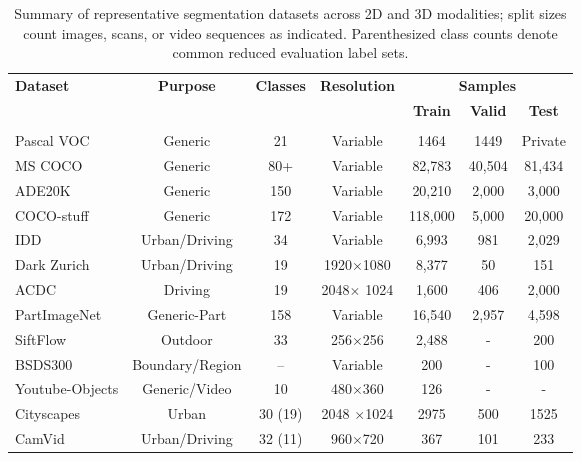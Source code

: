 \begin{table}[!t]
\centering
\caption{Summary of representative segmentation datasets across 2D and 3D modalities; split sizes count images, scans, or video sequences as indicated. Parenthesized class counts denote common reduced evaluation label sets.}
\label{tab:segmentation_dataset}
\fontsize{9}{11}\selectfont
\setlength{\tabcolsep}{3.7mm}
\begin{tabular}{l c cc ccc }
\toprule
\multirow{2}{*}{\textbf{Dataset}}   & \multirow{2}{*}{\textbf{Purpose}}   & \multirow{2}{*}{\textbf{Classes}} & \multirow{2}{*}{\textbf{Resolution}} & \multicolumn{3}{c}{\textbf{Samples}}  \\
\cmidrule(r){5-7}
  & & & & \textbf{Train} & \textbf{Valid} & \textbf{Test} \\
\midrule
\rowcolor{lightgrey}\multicolumn{7}{l}{$\bullet$ \textit{2D}}\\
Pascal VOC \cite{everingham2010pascal} & Generic & 21 & Variable & 1464 & 1449 & Private\\
MS COCO \cite{lin2014microsoft} & Generic & 80+ & Variable & 82,783 & 40,504 & 81,434\\
ADE20K \cite{zhou2017ade20k} & Generic & 150 & Variable & 20,210 & 2,000 & 3,000 \\
COCO-stuff \cite{COCO-Stuff-CaesarUF18} & Generic & 172 & Variable & 118,000 & 5,000 & 20,000 \\
IDD \cite{IDD-VarmaSNCJ19} & Urban/Driving & 34 & Variable & 6,993 & 981 & 2,029\\
Dark Zurich \cite{SakaridisDG19} & Urban/Driving & 19 & 1920$\times$1080& 8,377  & 50 & 151\\
ACDC \cite{ACDC-SakaridisDG21} & Driving & 19 & 2048$\times$ 1024& 1,600  & 406 & 2,000\\
PartImageNet \cite{PartImageNet-HeYYKYCLYYY22} & Generic-Part & 158 & Variable & 16,540 & 2,957 & 4,598\\
SiftFlow \cite{SiftFlow-LiuYT09} & Outdoor & 33 & 256$\times$256 & 2,488 & - & 200\\
BSDS300 \cite{BSD-MartinFTM01}& Boundary/Region & -- & Variable & 200 & - & 100 \\
Youtube-Objects \cite{PrestLCSF12} & Generic/Video & 10 & 480$\times$360 & 126 & - & - \\
Cityscapes~\cite{cordts2016cityscapes}  & Urban & 30 (19) & 2048 $\times$1024 & 2975 & 500 & 1525\\
CamVid \cite{CamVid-BrostowFC09} & Urban/Driving & 32 (11) & 960$\times$720 & 367 & 101 & 233 \\

\end{tabular}
\end{table}
